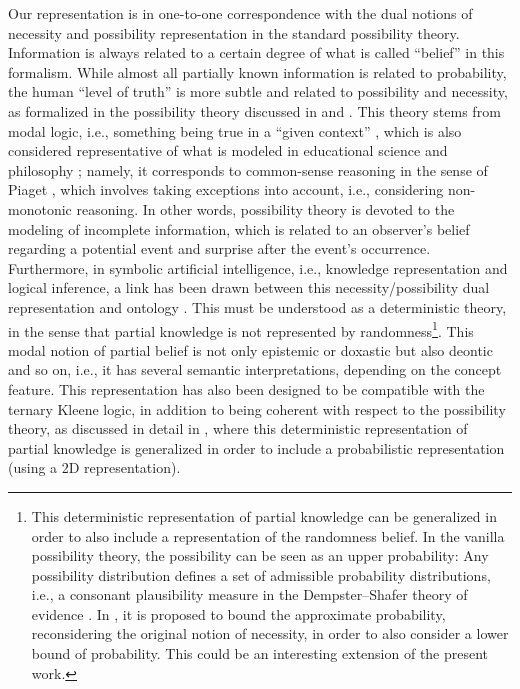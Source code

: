 \documentclass[sn-mathphys]{sn-jnl}
\begin{document}
Our representation is in one-to-one correspondence with the dual notions of necessity and possibility representation in the standard possibility theory. Information is always related to a certain degree of what is called ``belief'' in this formalism. While almost all partially known information is related to probability, the human ``level of truth'' is more subtle and related to possibility and necessity, as formalized in the possibility theory discussed in \cite{denoeux_representations_2020} and \cite{denoeux_representations_2020-1}. This theory stems from modal logic, i.e., something being true in a ``given context'' \cite{fischer_modal_2018}, which is also considered representative of what is modeled in educational science and philosophy \cite{rusawuk_possibility_2018}; namely, it corresponds to common-sense reasoning in the sense of Piaget \cite{smith_development_1994}, which involves taking exceptions into account, i.e., considering non-monotonic reasoning. In other words, possibility theory is devoted to the modeling of incomplete information, which is related to an observer's belief regarding a potential event and surprise after the event's occurrence. Furthermore, in symbolic artificial intelligence, i.e., knowledge representation and logical inference, a link has been drawn between this necessity/possibility dual representation and ontology \cite{tettamanzi_possibilistic_2017}. This must be understood as a deterministic theory, in the sense that partial knowledge is not represented by randomness\footnote{This deterministic representation of partial knowledge can be generalized in order to also include a representation of the randomness belief. In the vanilla possibility theory, the possibility can be seen as an upper probability: Any possibility distribution defines a set of admissible probability distributions, i.e., a consonant plausibility measure in the Dempster–Shafer theory of evidence \cite{beynon_dempstershafer_2000}. In \cite{vallaeys_generaliser_2021,vieville_representation_2022}, it is proposed to bound the approximate probability, reconsidering the original notion of necessity, in order to also consider a lower bound of probability. This could be an interesting extension of the present work.}.
This modal notion of partial belief is not only epistemic or doxastic but also deontic and so on, i.e., it has several semantic interpretations, depending on the concept feature.
This representation has also been designed to be compatible with the ternary Kleene logic, in addition to being coherent with respect to the possibility theory, as discussed in detail in \cite{vieville_representation_2022}, where this deterministic representation of partial knowledge is generalized in order to include a probabilistic representation (using a 2D representation). 
\end{document}
